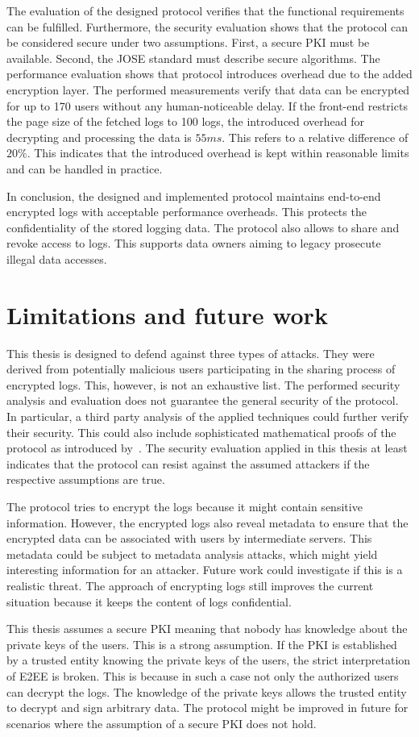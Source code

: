 \documentclass[../main.tex]{subfiles}
\begin{document}
The evaluation of the designed protocol verifies that the functional requirements can be fulfilled.
Furthermore, the security evaluation shows that the protocol can be considered secure under two assumptions.
First, a secure PKI must be available.
Second, the JOSE standard must describe secure algorithms.
The performance evaluation shows that protocol introduces overhead due to the added encryption layer.
The performed measurements verify that data can be encrypted for up to 170 users without any human-noticeable delay.
If the front-end restricts the page size of the fetched logs to 100 logs, the introduced overhead for decrypting and processing the data is $55ms$.
This refers to a relative difference of $20\%$.
This indicates that the introduced overhead is kept within reasonable limits and can be handled in practice.

In conclusion, the designed and implemented protocol maintains end-to-end encrypted logs with acceptable performance overheads.
This protects the confidentiality of the stored logging data.
The protocol also allows to share and revoke access to logs.
This supports data owners aiming to legacy prosecute illegal data accesses.


\section{Limitations and future work}
\label{sec:limitations}
This thesis is designed to defend against three types of attacks.
They were derived from potentially malicious users participating in the sharing process of encrypted logs.
This, however, is not an exhaustive list.
The performed security analysis and evaluation does not guarantee the general security of the protocol.
In particular, a third party analysis of the applied techniques could further verify their security.
This could also include sophisticated mathematical proofs of the protocol as introduced by~\cite{Katz2020}.   
The security evaluation applied in this thesis at least indicates that the protocol can resist against the assumed attackers if the respective assumptions are true.

The protocol tries to encrypt the logs because it might contain sensitive information.
However, the encrypted logs also reveal metadata to ensure that the encrypted data can be associated with users by intermediate servers.
This metadata could be subject to metadata analysis attacks, which might yield interesting information for an attacker.
Future work could investigate if this is a realistic threat.
The approach of encrypting logs still improves the current situation because it keeps the content of logs confidential.

This thesis assumes a secure PKI meaning that nobody has knowledge about the private keys of the users.
This is a strong assumption.
If the PKI is established by a trusted entity knowing the private keys of the users, the strict interpretation of E2EE is broken.
This is because in such a case not only the authorized users can decrypt the logs.
The knowledge of the private keys allows the trusted entity to decrypt and sign arbitrary data.
The protocol might be improved in future for scenarios where the assumption of a secure PKI does not hold.
\end{document}
